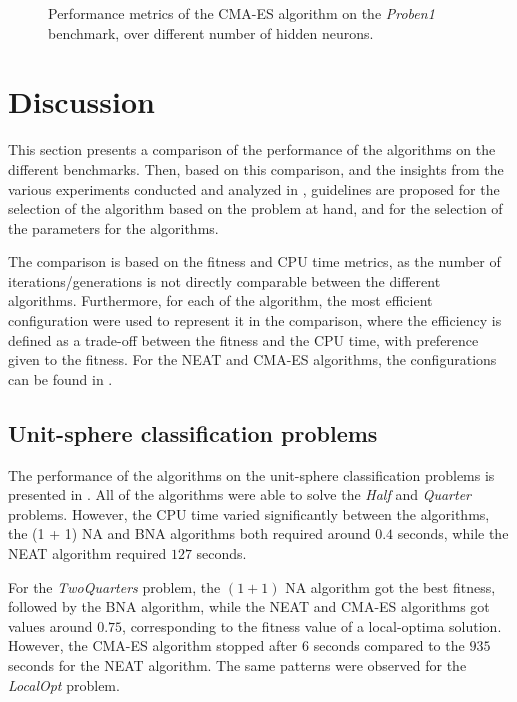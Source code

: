 \begin{figure}
\begin{center}
    \end{center}
    \caption{Performance metrics of the CMA-ES algorithm on the \textit{Proben1} benchmark, over different number of hidden neurons.}
    \label{fig:cmaes_proben1}
\end{figure}

\section{Discussion}

This section presents a comparison of the performance of the algorithms on the different benchmarks.
Then, based on this comparison, and the insights from the various experiments conducted and analyzed in , guidelines are proposed for the selection of the algorithm
based on the problem at hand, and for the selection of the parameters for the algorithms.

The comparison is based on the fitness and CPU time metrics, as the number of iterations/generations is not directly comparable between the different algorithms.
Furthermore, for each of the algorithm, the most efficient configuration were used to represent it in the comparison, where the efficiency is defined as a trade-off between the fitness
and the CPU time, with preference given to the fitness. For the NEAT and CMA-ES algorithms, the configurations can be found in .

\subsection{Unit-sphere classification problems}

The performance of the algorithms on the unit-sphere classification problems is presented in .
All of the algorithms were able to solve the \textit{Half} and \textit{Quarter} problems.  However, the CPU time varied significantly between the algorithms, the (1 + 1) NA and BNA algorithms
both required around $0.4$ seconds, while the NEAT algorithm required $127$ seconds.

For the \textit{TwoQuarters} problem, the $(1 + 1)$ NA algorithm got the best fitness, followed by the BNA algorithm, while the NEAT and CMA-ES algorithms got values around $0.75$,
corresponding to the fitness value of a local-optima solution. However, the CMA-ES algorithm stopped after $6$ seconds compared to the $935$ seconds for the NEAT algorithm.
The same patterns were observed for the \textit{LocalOpt} problem.

